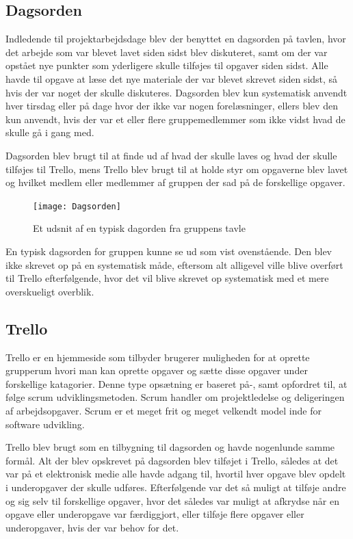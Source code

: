 \subsection*{Dagsorden}\label{Dagsorden}
Indledende til projektarbejdsdage blev der benyttet en dagsorden på tavlen, hvor det arbejde som var blevet lavet siden sidst blev diskuteret, samt om der var opstået nye punkter som yderligere skulle tilføjes til opgaver siden sidst. Alle havde til opgave at læse det nye materiale der var blevet skrevet siden sidst, så hvis der var noget der skulle diskuteres. Dagsorden blev kun systematisk anvendt hver tirsdag eller på dage hvor der ikke var nogen forelæsninger, ellers blev den kun anvendt, hvis der var et eller flere gruppemedlemmer som ikke vidst hvad de skulle gå i gang med.

\vspace{5mm}

Dagsorden blev brugt til at finde ud af hvad der skulle laves og hvad der skulle tilføjes til Trello, mens Trello blev brugt til at holde styr om opgaverne blev lavet og hvilket medlem eller medlemmer af gruppen der sad på de forskellige opgaver.

\begin{figure}[H]
\texttt{[image: Dagsorden]}
\centering
\caption{Et udsnit af en typisk dagorden fra gruppens tavle}\label{Dagsorden}
\end{figure}

En typisk dagsorden for gruppen kunne se ud som vist ovenstående. Den blev ikke skrevet op på en systematisk måde, eftersom alt alligevel ville blive overført til Trello efterfølgende, hvor det vil blive skrevet op systematisk med et mere overskueligt overblik.

\subsection*{Trello}\label{Trello}
Trello er en hjemmeside som tilbyder brugerer muligheden for at oprette grupperum hvori man kan oprette opgaver og sætte disse opgaver under forskellige katagorier. Denne type opsætning er baseret på-, samt opfordret til, at følge scrum udviklingsmetoden. Scrum handler om projektledelse og deligeringen af arbejdsopgaver. Scrum er et meget frit og meget velkendt model inde for software udvikling.

\vspace{5mm}

Trello blev brugt som en tilbygning til dagsorden og havde nogenlunde samme formål. Alt der blev opskrevet på dagsorden blev tilføjet i Trello, således at det var på et elektronisk medie alle havde adgang til, hvortil hver opgave blev opdelt i underopgaver der skulle udføres. Efterfølgende var det så muligt at tilføje andre og sig selv til forskellige opgaver, hvor det således var muligt at afkrydse når en opgave eller underopgave var færdiggjort, eller tilføje flere  opgaver eller underopgaver, hvis der var behov for det.

